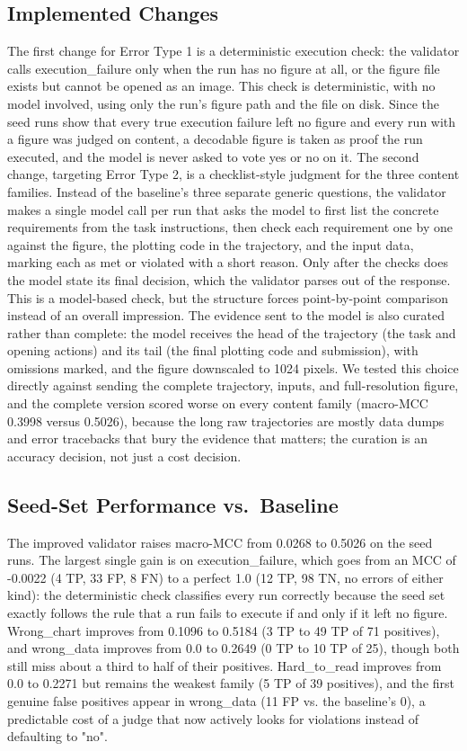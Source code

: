 \documentclass[11pt]{article}
\begin{document}
\subsection{Implemented Changes}
The first change for Error Type 1 is a deterministic execution check: the validator calls execution_failure only when the run has no figure at all, or the figure file exists but cannot be opened as an image. This check is deterministic, with no model involved, using only the run's figure path and the file on disk. Since the seed runs show that every true execution failure left no figure and every run with a figure was judged on content, a decodable figure is taken as proof the run executed, and the model is never asked to vote yes or no on it. The second change, targeting Error Type 2, is a checklist-style judgment for the three content families. Instead of the baseline's three separate generic questions, the validator makes a single model call per run that asks the model to first list the concrete requirements from the task instructions, then check each requirement one by one against the figure, the plotting code in the trajectory, and the input data, marking each as met or violated with a short reason. Only after the checks does the model state its final decision, which the validator parses out of the response. This is a model-based check, but the structure forces point-by-point comparison instead of an overall impression. The evidence sent to the model is also curated rather than complete: the model receives the head of the trajectory (the task and opening actions) and its tail (the final plotting code and submission), with omissions marked, and the figure downscaled to 1024 pixels. We tested this choice directly against sending the complete trajectory, inputs, and full-resolution figure, and the complete version scored worse on every content family (macro-MCC 0.3998 versus 0.5026), because the long raw trajectories are mostly data dumps and error tracebacks that bury the evidence that matters; the curation is an accuracy decision, not just a cost decision.

\subsection{Seed-Set Performance vs.\ Baseline}
The improved validator raises macro-MCC from 0.0268 to 0.5026 on the seed runs. The largest single gain is on execution_failure, which goes from an MCC of -0.0022 (4 TP, 33 FP, 8 FN) to a perfect 1.0 (12 TP, 98 TN, no errors of either kind): the deterministic check classifies every run correctly because the seed set exactly follows the rule that a run fails to execute if and only if it left no figure. Wrong_chart improves from 0.1096 to 0.5184 (3 TP to 49 TP of 71 positives), and wrong_data improves from 0.0 to 0.2649 (0 TP to 10 TP of 25), though both still miss about a third to half of their positives. Hard_to_read improves from 0.0 to 0.2271 but remains the weakest family (5 TP of 39 positives), and the first genuine false positives appear in wrong_data (11 FP vs. the baseline's 0), a predictable cost of a judge that now actively looks for violations instead of defaulting to "no".
\end{document}

